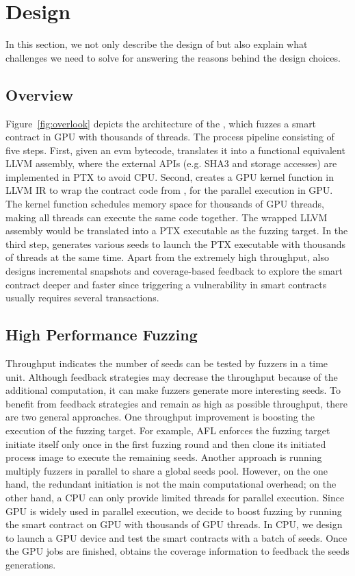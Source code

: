 \section{Design}
In this section, we not only describe the design of  {\tool} but also explain what challenges we need to solve for answering the reasons behind the design choices.  

\subsection{Overview}
Figure~\ref{fig:overlook} depicts the architecture of the {\tool}, which fuzzes a smart contract in GPU with thousands of threads. 
%
The process pipeline consisting of five steps. 
%
First, given an evm bytecode, {\translator} translates it into a functional equivalent LLVM assembly, where the external APIs (e.g. SHA3 and storage accesses) are implemented in PTX to avoid CPU.
%
Second, {\wrapper} creates a GPU kernel function in LLVM IR to wrap the contract code from {\translator}, for the parallel execution in GPU. The kernel function schedules memory space for thousands of GPU threads, making all threads can execute the same code together. The wrapped LLVM assembly would be translated into a PTX executable as the fuzzing target. 
%
In the third step, {\runner} generates various seeds to launch the PTX executable with thousands of threads at the same time. Apart from the extremely high throughput, {\runner} also designs incremental snapshots and coverage-based feedback to explore the smart contract deeper and faster since triggering a vulnerability in smart contracts usually requires several transactions\cite{}. 

\subsection{High Performance Fuzzing}

Throughput indicates the number of seeds can be tested by fuzzers in a time unit. 
Although feedback strategies may decrease the throughput because of the additional computation, it can make fuzzers generate more interesting seeds. 
To benefit from feedback strategies and remain as high as possible throughput, there are two general approaches.
%
One throughput improvement is boosting the execution of the fuzzing target. For example, AFL\cite{} enforces the fuzzing target initiate itself only once in the first fuzzing round and then clone its initiated process image to execute the remaining seeds.
%
Another approach is running multiply fuzzers in parallel to share a global seeds pool.
%
However, on the one hand, the redundant initiation is not the main computational overhead; on the other hand, a CPU can only provide limited threads for parallel execution.
%
Since GPU is widely used in parallel execution, we decide to boost fuzzing by running the smart contract on GPU with thousands of GPU threads. 
In CPU, we design {\runner} to launch a GPU device and test the smart contracts with a batch of seeds. Once the GPU jobs are finished, {\runner} obtains the coverage information to feedback the seeds generations. 


